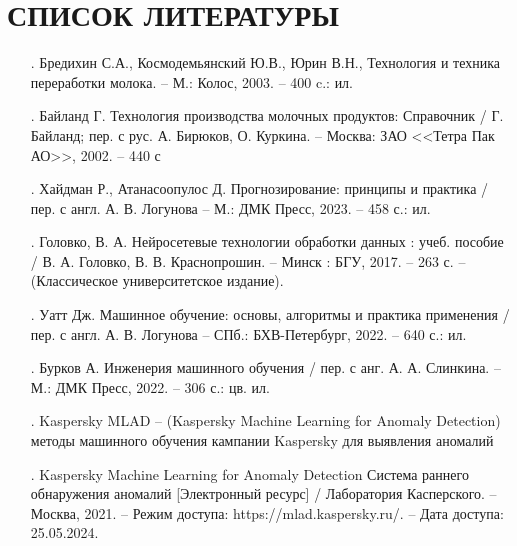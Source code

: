 \sectionbreak \section*{ 
    \gostTitleFont
    \redline
    СПИСОК ЛИТЕРАТУРЫ
}
\titlespace

{\gostFont

\begin{itemize}[leftmargin=2.15cm, labelwidth=0.65cm, labelsep=0.0cm] 

	\item[\theimagecntr.] Бредихин С.А., Космодемьянский Ю.В., Юрин В.Н., Технология и техника переработки молока. {--} М.: Колос, 2003. {--} 400 c.: ил.
	\addtocounter{imagecntr}{1}

    \item[\theimagecntr.] Байланд Г. Технология производства молочных продуктов: Справочник / Г. Байланд; пер. с рус. А. Бирюков, О. Куркина. {--} Москва: ЗАО <<Тетра Пак АО>>, 2002. {--} 440 с
    \addtocounter{imagecntr}{1}

    \item[\theimagecntr.] Хайдман Р., Атанасоопулос Д. Прогнозирование: принципы и практика / пер. с англ. А. В. Логунова {--} М.: ДМК Пресс, 2023. {--} 458 с.: ил. 
    \addtocounter{imagecntr}{1}

    \item[\theimagecntr.] Головко, В. А. Нейросетевые технологии обработки данных : учеб. пособие / В. А. Головко, В. В. Краснопрошин. {--} Минск : БГУ, 2017. {--} 263 с. {--} (Классическое университетское издание).
    \addtocounter{imagecntr}{1}

    \item[\theimagecntr.] Уатт Дж. Машинное обучение: основы, алгоритмы и практика применения / пер. с англ. А. В. Логунова {--} СПб.: БХВ-Петербург, 2022. {--} 640 с.: ил. 
    \addtocounter{imagecntr}{1}

    \item[\theimagecntr.] Бурков А. Инженерия машинного обучения / пер. с анг. А. А. Слинкина. {--} М.: ДМК Пресс, 2022. {--} 306 с.: цв. ил.
    \addtocounter{imagecntr}{1}

    \item[\theimagecntr.] Kaspersky MLAD {--} (Kaspersky Machine Learning for Anomaly Detection) методы машинного обучения кампании Kaspersky для выявления аномалий
    \addtocounter{imagecntr}{1}

    \item[\theimagecntr.] Kaspersky Machine Learning for Anomaly Detection Система раннего обнаружения аномалий [Электронный ресурс] / Лаборатория Касперского. {--} Москва, 2021. {--} Режим доступа: https://mlad.kaspersky.ru/. – Дата доступа: 25.05.2024.
    \addtocounter{imagecntr}{1}


\end{itemize}}
